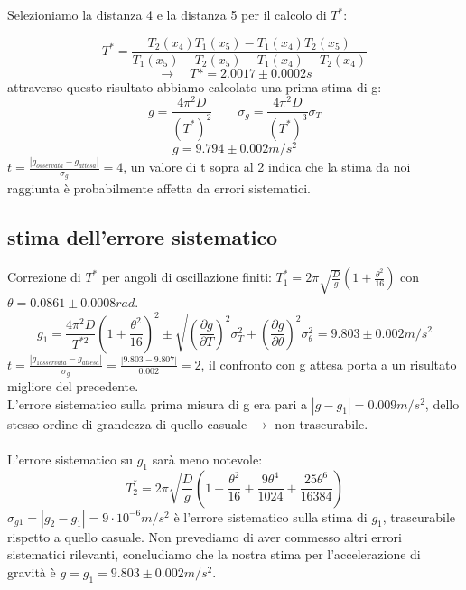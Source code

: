 \documentclass[a4paper]{article}
\theoremstyle{definition}
\begin{document}
\noindent Selezioniamo la distanza 4 e la distanza 5 per il calcolo di \(T^{*}\):

\[T^{*} = \frac{T_{2}(x_{4})T_{1}(x_{5})-T_{1}(x_{4})T_{2}(x_{5})}{T_{1}(x_{5})-T_{2}(x_{5})-T_{1}(x_{4})+T_{2}(x_{4})}\]
\[\rightarrow \quad T*=2.0017 \pm 0.0002 s\]
attraverso questo risultato abbiamo calcolato una prima stima di g:
\[g = \frac{4\pi ^{2}D}{(T^{*})^{2}} \qquad \sigma _{g} = \frac{4\pi ^{2}D}{(T^{*})^{3}}\sigma _{T}\]
\[g = 9.794 \pm 0.002 m/s^{2}\]
\noindent \(t= \frac{\left | g_{osservata} - g_{attesa} \right |}{\sigma_{g}} = 4\), un valore di t sopra al 2 indica che la stima da noi raggiunta è probabilmente affetta da errori sistematici.\\

\subsection*{stima dell'errore sistematico}
\noindent Correzione di \(T^{*}\) per angoli di oscillazione finiti: \(T^{*}_{1} = 2\pi \sqrt{\frac{D}{g}}(1+\frac{\theta ^{2}}{16})\) con \(\theta = 0.0861 \pm 0.0008 rad\).\\
\[g_{1}= \frac{4\pi ^{2}D}{T^{*2}}\left ( 1+\frac{\theta ^{2}}{16} \right )^{2} \pm \sqrt{\left ( \frac{\partial g}{\partial T} \right )^{2}\sigma _{T}^{2}+\left ( \frac{\partial g}{\partial \theta }\right )^{2}\sigma _{\theta }^{2} }=9.803\pm0.002 m/s^{2}\]
\(t= \frac{\left | g_{1 osservata} - g_{attesa} \right |}{\sigma_{g}} = \frac{\left | 9.803 - 9.807 \right |}{0.002} = 2\), il confronto con g attesa porta a un risultato migliore del precedente.\\
\noindent L'errore sistematico sulla prima misura di g era pari a \( \left | g-g_{1} \right | =  0.009 m/s^{2}\), dello stesso ordine di grandezza di quello casuale \(\rightarrow\) non trascurabile.\\\\
L'errore sistematico su \(g_{1}\) sarà meno notevole:
\[ T^{*}_{2}= 2\pi \sqrt{\frac{D}{g}} \left (1+\frac{\theta ^{2}}{16}+\frac{9\theta ^{4}}{1024}+\frac{25\theta ^{6}}{16384} \right )\] 
 \( \sigma_{g1}=\left | g_{2}-g_{1} \right | =  9 \cdot 10^{-6} m/s^{2}\) è l'errore sistematico sulla stima di \(g_{1}\), trascurabile rispetto a quello casuale.  Non prevediamo di aver commesso altri errori sistematici rilevanti, concludiamo che la nostra stima per l'accelerazione di gravità è \(g = g_{1} = 9.803 \pm 0.002 m/s^{2}\).
\end{document}
